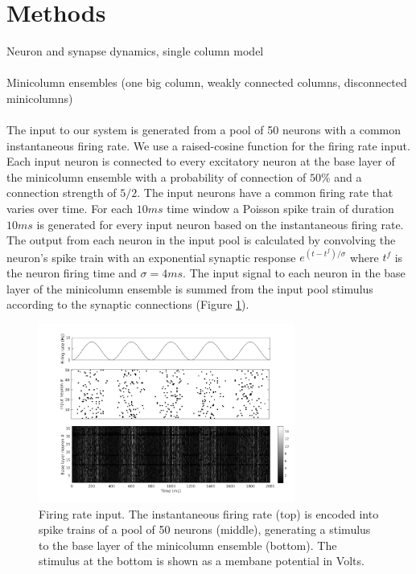 \documentclass[a4paper,11pt]{article}
\begin{document}
\section{Methods}
Neuron and synapse dynamics, single column model
\\ \\
Minicolumn ensembles (one big column, weakly connected columns, disconnected minicolumns)
\\ \\
The input to our system is generated from a pool of 50 neurons with a common instantaneous firing rate.
We use a raised-cosine function for the firing rate input.
Each input neuron is connected to every excitatory neuron at the base layer of the minicolumn ensemble with a probability of connection of $50\%$ and a connection strength of $5/2$. 
The input neurons have a common firing rate that varies over time.
For each $10 ms$ time window a Poisson spike train of duration $10 ms$ is generated for every input neuron based on the instantaneous firing rate.
The output from each neuron in the input pool is calculated by convolving the neuron's spike train with an exponential synaptic response $e^{(t-t^f)/\sigma}$ where $t^f$ is the neuron firing time and $\sigma = 4ms$.
The input signal to each neuron in the base layer of the minicolumn ensemble is summed from the input pool stimulus according to the synaptic connections (Figure \ref{fig:firingrate_input}).

\begin{figure}[!ht]
 \caption{Firing rate input. The instantaneous firing rate (top) is encoded into spike trains of a pool of 50 neurons (middle), generating a stimulus to the base layer of the minicolumn ensemble (bottom). The stimulus at the bottom is shown as a membane potential in Volts.}
 \label{fig:firingrate_input}
 \centering
   \includegraphics[width=0.75\textwidth]{fig/InputFiringRate}
\end{figure}
\end{document}
